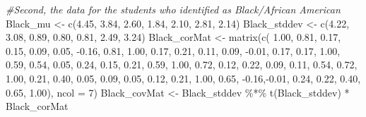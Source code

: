 \documentclass[
  english,
]{book}
\newenvironment{Shaded}{\begin{snugshade}}{\end{snugshade}}
\newcommand{\AttributeTok}[1]{\textcolor[rgb]{0.77,0.63,0.00}{#1}}
\newcommand{\CommentTok}[1]{\textcolor[rgb]{0.56,0.35,0.01}{\textit{#1}}}
\newcommand{\DecValTok}[1]{\textcolor[rgb]{0.00,0.00,0.81}{#1}}
\newcommand{\FloatTok}[1]{\textcolor[rgb]{0.00,0.00,0.81}{#1}}
\newcommand{\FunctionTok}[1]{\textcolor[rgb]{0.00,0.00,0.00}{#1}}
\newcommand{\NormalTok}[1]{#1}
\newcommand{\OtherTok}[1]{\textcolor[rgb]{0.56,0.35,0.01}{#1}}
\newcommand{\SpecialCharTok}[1]{\textcolor[rgb]{0.00,0.00,0.00}{#1}}
\begin{document}
\begin{Shaded}
\begin{Highlighting}[]
\CommentTok{\#Second, the data for the students who identified as Black/African American}
\NormalTok{Black\_mu }\OtherTok{\textless{}{-}} \FunctionTok{c}\NormalTok{(}\FloatTok{4.45}\NormalTok{, }\FloatTok{3.84}\NormalTok{, }\FloatTok{2.60}\NormalTok{, }\FloatTok{1.84}\NormalTok{, }\FloatTok{2.10}\NormalTok{, }\FloatTok{2.81}\NormalTok{, }\FloatTok{2.14}\NormalTok{)}
\NormalTok{Black\_stddev }\OtherTok{\textless{}{-}} \FunctionTok{c}\NormalTok{(}\FloatTok{4.22}\NormalTok{, }\FloatTok{3.08}\NormalTok{, }\FloatTok{0.89}\NormalTok{, }\FloatTok{0.80}\NormalTok{, }\FloatTok{0.81}\NormalTok{, }\FloatTok{2.49}\NormalTok{, }\FloatTok{3.24}\NormalTok{)}
\NormalTok{Black\_corMat }\OtherTok{\textless{}{-}} \FunctionTok{matrix}\NormalTok{(}\FunctionTok{c}\NormalTok{( }\FloatTok{1.00}\NormalTok{,  }\FloatTok{0.81}\NormalTok{,  }\FloatTok{0.17}\NormalTok{,  }\FloatTok{0.15}\NormalTok{,  }\FloatTok{0.09}\NormalTok{,  }\FloatTok{0.05}\NormalTok{, }\SpecialCharTok{{-}}\FloatTok{0.16}\NormalTok{,}
              \FloatTok{0.81}\NormalTok{,  }\FloatTok{1.00}\NormalTok{,  }\FloatTok{0.17}\NormalTok{,  }\FloatTok{0.21}\NormalTok{,  }\FloatTok{0.11}\NormalTok{,  }\FloatTok{0.09}\NormalTok{, }\SpecialCharTok{{-}}\FloatTok{0.01}\NormalTok{,}
              \FloatTok{0.17}\NormalTok{,  }\FloatTok{0.17}\NormalTok{,  }\FloatTok{1.00}\NormalTok{,  }\FloatTok{0.59}\NormalTok{,  }\FloatTok{0.54}\NormalTok{,  }\FloatTok{0.05}\NormalTok{,  }\FloatTok{0.24}\NormalTok{,}
              \FloatTok{0.15}\NormalTok{,  }\FloatTok{0.21}\NormalTok{,  }\FloatTok{0.59}\NormalTok{,  }\FloatTok{1.00}\NormalTok{,  }\FloatTok{0.72}\NormalTok{,  }\FloatTok{0.12}\NormalTok{,  }\FloatTok{0.22}\NormalTok{,}
              \FloatTok{0.09}\NormalTok{,  }\FloatTok{0.11}\NormalTok{,  }\FloatTok{0.54}\NormalTok{,  }\FloatTok{0.72}\NormalTok{,  }\FloatTok{1.00}\NormalTok{,  }\FloatTok{0.21}\NormalTok{,  }\FloatTok{0.40}\NormalTok{,}
              \FloatTok{0.05}\NormalTok{,  }\FloatTok{0.09}\NormalTok{,  }\FloatTok{0.05}\NormalTok{,  }\FloatTok{0.12}\NormalTok{,  }\FloatTok{0.21}\NormalTok{,  }\FloatTok{1.00}\NormalTok{,  }\FloatTok{0.65}\NormalTok{,}
              \SpecialCharTok{{-}}\FloatTok{0.16}\NormalTok{,}\SpecialCharTok{{-}}\FloatTok{0.01}\NormalTok{,  }\FloatTok{0.24}\NormalTok{,  }\FloatTok{0.22}\NormalTok{,  }\FloatTok{0.40}\NormalTok{,  }\FloatTok{0.65}\NormalTok{,  }\FloatTok{1.00}\NormalTok{),}
           \AttributeTok{ncol =} \DecValTok{7}\NormalTok{)}
\NormalTok{Black\_covMat }\OtherTok{\textless{}{-}}\NormalTok{ Black\_stddev }\SpecialCharTok{\%*\%} \FunctionTok{t}\NormalTok{(Black\_stddev) }\SpecialCharTok{*}\NormalTok{ Black\_corMat}

\end{Highlighting}
\end{Shaded}
\end{document}
